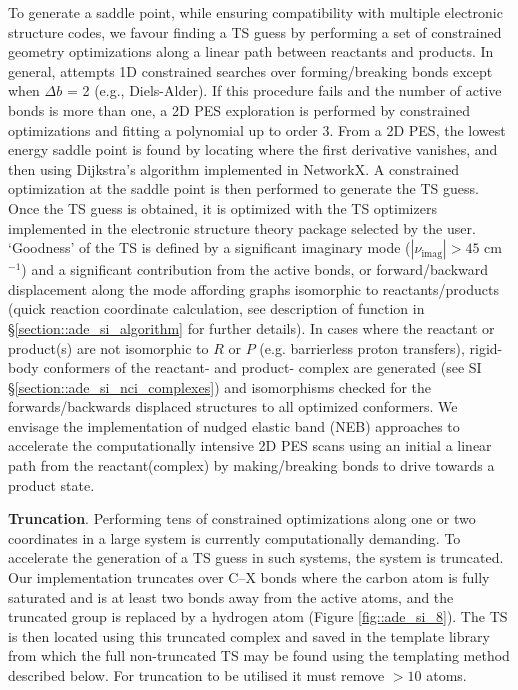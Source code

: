 \documentclass[../../main.tex]{subfiles}
\begin{document}
To generate a saddle point, while ensuring compatibility with multiple electronic structure codes, we favour finding a TS guess by performing a set of constrained geometry optimizations along a linear path between reactants and products. In general, \ade attempts 1D constrained searches over forming/breaking bonds except when $\Delta b$ = 2 (e.g., Diels-Alder). If this procedure fails and the number of active bonds is more than one, a 2D PES exploration is performed by constrained optimizations and fitting a polynomial up to order 3.\cite{SciPy} From a 2D PES, the lowest energy saddle point is found by locating where the first derivative vanishes, and then using Dijkstra's algorithm\cite{Dijkstra1959} implemented in NetworkX.\cite{NetworkX} A constrained optimization at the saddle point is then performed to generate the TS guess. Once the TS guess is obtained, it is optimized with the TS optimizers implemented in the electronic structure theory package selected by the user. ‘Goodness’ of the TS is defined by a significant imaginary mode ($|\nu_\text{imag}| > 45$ cm$^{-1}$) and a significant contribution from the active bonds, or forward/backward displacement along the mode affording graphs isomorphic to reactants/products (quick reaction coordinate calculation,\cite{Goodman2003} see description of  function in §\ref{section::ade_si_algorithm} for further details). In cases where the reactant or product(s) are not isomorphic to $R$ or $P$ (e.g. barrierless proton transfers), rigid-body conformers of the reactant- and product- complex are generated (see SI §\ref{section::ade_si_nci_complexes}) and isomorphisms checked for the forwards/backwards displaced structures to all optimized conformers. We envisage the implementation of nudged elastic band (NEB) approaches to accelerate the computationally intensive 2D PES scans using an initial a linear path from the reactant(complex) by making/breaking bonds to drive towards a product state.


{\textbf{Truncation}}. Performing tens of constrained optimizations along one or two coordinates in a large system is currently computationally demanding. To accelerate the generation of a TS guess in such systems, the system is truncated. Our implementation truncates over C--X bonds where the carbon atom is fully saturated and is at least two bonds away from the active atoms, and the truncated group is replaced by a hydrogen atom (Figure \ref{fig::ade_si_8}). The TS is then located using this truncated complex and saved in the template library from which the full non-truncated TS may be found using the templating method described below. For truncation to be utilised it must remove $>10$ atoms. 
\end{document}
